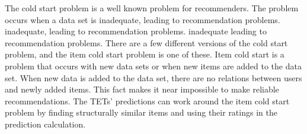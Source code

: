 The cold start problem is a well known problem for recommenders\cite{Ricci2015}\cite{saveski2014item}.
The problem occurs when a data set is inadequate, leading to recommendation problems.
inadequate, leading to recommendation problems.
inadequate leading to recommendation problems.
There are a few different versions of the cold start problem, and the item cold start problem is one of these. 
Item cold start is a problem that occurs with new data sets or when new items are added to the data set.
When new data is added to the data set, there are no relations between users and newly added items.
This fact makes it near impossible to make reliable recommendations.
The TETs' predictions can work around the item cold start problem by finding structurally similar items and using their ratings in the prediction calculation.
